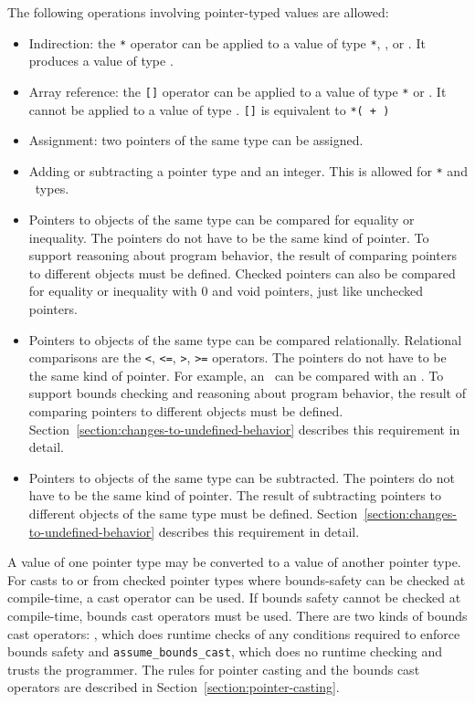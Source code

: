 The following operations involving pointer-typed values are allowed:

\begin{itemize}
\item
  Indirection: the \texttt{*} operator can be applied to a value of type
   \texttt{*}, \ptrT, or \arrayptrT. It produces a value of type .
\item
  Array reference: the \texttt{[]} operator can be applied to a
  value of type  \texttt{*} or \arrayptrT. It
  cannot be applied to a value of type \ptrT.
  \texttt{[]} is equivalent to
  \texttt{*( + )}
\item
  Assignment: two pointers of the same type can be assigned.
\item
  Adding or subtracting a pointer type and an integer. This is allowed
  for  \texttt{*} and \arrayptrT\ types.
\item
  Pointers to objects of the same type can be compared for equality or
  inequality. The pointers do not have to be the same kind of pointer.
  To support reasoning about program behavior, the result of comparing
  pointers to different objects must be defined.  Checked pointers can also
  be compared for equality or inequality with 0 and void pointers, 
  just like unchecked pointers.
\item
  Pointers to objects of the same type can be compared relationally. Relational comparisons are the
  \verb|<|, \verb|<=|, \verb|>|, \verb|>=| operators. The pointers do not have to be
  the same kind of pointer. For example, an \uncheckedptrT\ can be compared with an
  \arrayptrT . To support bounds checking and reasoning about program behavior, the
  result of comparing pointers to different objects must be defined.
  Section~\ref{section:changes-to-undefined-behavior} describes this requirement in detail.
\item
  Pointers to objects of the same type can be subtracted. The pointers do not have to be
  the same kind of
  pointer. The result of subtracting pointers to different objects of
  the same type must be defined. Section~\ref{section:changes-to-undefined-behavior}
  describes this requirement in detail.
\end{itemize}

A value of one pointer type may be converted to a value of another
pointer type. For casts to or from checked pointer types where
bounds-safety can be checked at compile-time, a cast operator can be
used. If bounds safety cannot be checked at compile-time, bounds cast
operators must be used. There are two kinds of bounds cast operators:
, which does runtime checks of any
conditions required to enforce bounds safety and
\texttt{assume\_bounds\_cast}, which does no runtime checking and
trusts the programmer. The rules for pointer casting and the bounds cast
operators are described in Section~\ref{section:pointer-casting}.

